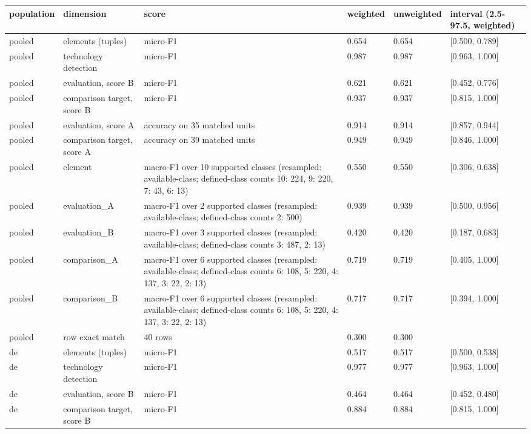 \begin{table}[htbp]
\centering
\small
\begin{tabular}{llllll}
\toprule
\textbf{population} & \textbf{dimension} & \textbf{score} & \textbf{weighted} & \textbf{unweighted} & \textbf{interval (2.5-97.5, weighted)} \\
\midrule
pooled & elements (tuples) & micro-F1 & 0.654 & 0.654 & [0.500, 0.789] \\
pooled & technology detection & micro-F1 & 0.987 & 0.987 & [0.963, 1.000] \\
pooled & evaluation, score B & micro-F1 & 0.621 & 0.621 & [0.452, 0.776] \\
pooled & comparison target, score B & micro-F1 & 0.937 & 0.937 & [0.815, 1.000] \\
pooled & evaluation, score A & accuracy on 35 matched units & 0.914 & 0.914 & [0.857, 0.944] \\
pooled & comparison target, score A & accuracy on 39 matched units & 0.949 & 0.949 & [0.846, 1.000] \\
pooled & element & macro-F1 over 10 supported classes (resampled: available-class; defined-class counts {10: 224, 9: 220, 7: 43, 6: 13}) & 0.550 & 0.550 & [0.306, 0.638] \\
pooled & evaluation\_A & macro-F1 over 2 supported classes (resampled: available-class; defined-class counts {2: 500}) & 0.939 & 0.939 & [0.500, 0.956] \\
pooled & evaluation\_B & macro-F1 over 3 supported classes (resampled: available-class; defined-class counts {3: 487, 2: 13}) & 0.420 & 0.420 & [0.187, 0.683] \\
pooled & comparison\_A & macro-F1 over 6 supported classes (resampled: available-class; defined-class counts {6: 108, 5: 220, 4: 137, 3: 22, 2: 13}) & 0.719 & 0.719 & [0.405, 1.000] \\
pooled & comparison\_B & macro-F1 over 6 supported classes (resampled: available-class; defined-class counts {6: 108, 5: 220, 4: 137, 3: 22, 2: 13}) & 0.717 & 0.717 & [0.394, 1.000] \\
pooled & row exact match & 40 rows & 0.300 & 0.300 &  \\
de & elements (tuples) & micro-F1 & 0.517 & 0.517 & [0.500, 0.538] \\
de & technology detection & micro-F1 & 0.977 & 0.977 & [0.963, 1.000] \\
de & evaluation, score B & micro-F1 & 0.464 & 0.464 & [0.452, 0.480] \\
de & comparison target, score B & micro-F1 & 0.884 & 0.884 & [0.815, 1.000] \\

\end{tabular}
\end{table}
